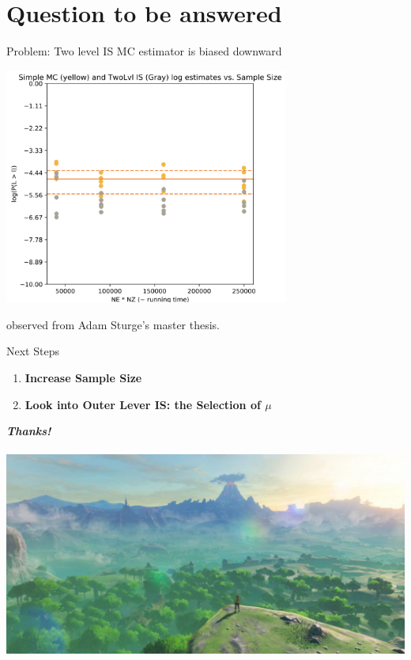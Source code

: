 \documentclass{beamer}
\begin{document}
\section{Question to be answered}

\begin{frame}{Problem: Two level IS MC estimator is biased downward}
\begin{center}
    \includegraphics[width=0.70\textwidth]{gl_downward_bias.png}
\end{center}
observed from Adam Sturge's master thesis.
\end{frame}

\begin{frame}{Next Steps}
\begin{center}
    \begin{enumerate}
        \item \textbf{Increase Sample Size}
        \item \textbf{Look into Outer Lever IS: the Selection of $\mu$}
    \end{enumerate}
\end{center}
\end{frame}

\begin{frame}
\begin{center}
    \textbf{\textit{Thanks!}} \\
    $ $\\
    \includegraphics[width=\textwidth]{botw_view.jpg}
\end{center}
\end{frame}
\end{document}
